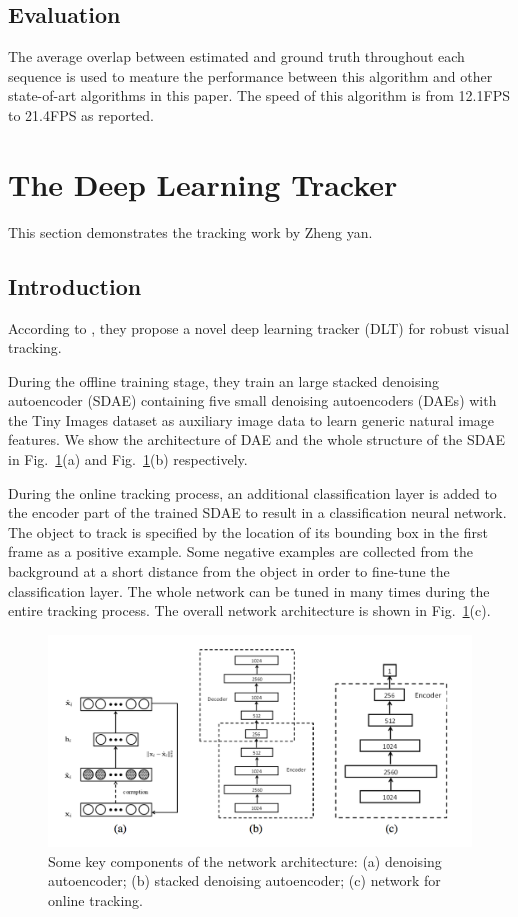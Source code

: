 \documentclass{article}
\begin{document}
\subsection{Evaluation}
The average overlap between estimated and ground truth throughout each sequence is used to meature the performance between this algorithm and other state-of-art algorithms in this paper.
The speed of this algorithm is from 12.1FPS to 21.4FPS as reported.

\section{The Deep Learning Tracker}
This section demonstrates the tracking work by Zheng yan.
\subsection{Introduction}
According to \cite{dlt}, they propose a novel deep learning tracker (DLT) for robust visual tracking.

During the offline training stage, they train an large stacked denoising autoencoder (SDAE) containing five small denoising autoencoders (DAEs) with the Tiny Images dataset \cite{tiny} as auxiliary image data to learn generic natural image features.
We show the architecture of DAE and the whole structure of the SDAE in Fig.~\ref{fig:dlt}(a) and Fig.~\ref{fig:dlt}(b) respectively.

During the online tracking process, an additional classification layer is added to the encoder part of the trained SDAE to result in a classification neural network.
The object to track is specified by the location of its bounding box in the first frame as a positive example.
Some negative examples are collected from the background at a short distance from the object in order to fine-tune the classification layer.
The whole network can be tuned in many times during the entire tracking process.
The overall network architecture is shown in Fig.~\ref{fig:dlt}(c).

\begin{center}
    \begin{figure}[hbt]
      \includegraphics[width=\textwidth]{dlt.png}
      \caption{Some key components of the network architecture: (a) denoising autoencoder; (b) stacked denoising autoencoder; (c) network for online tracking.}
      \label{fig:dlt}
    \end{figure}
\end{center}
\end{document}
